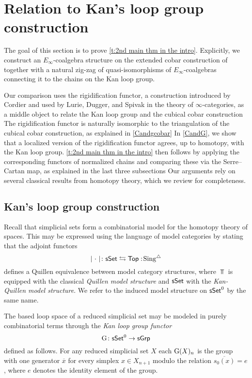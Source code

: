 
\section{Relation to Kan's loop group construction} \label{s:theorem2}

The goal of this section is to prove \cref{t:2nd main thm in the intro}.
Explicitly, we construct an $E_{\infty}$-coalgebra structure on the extended cobar construction of \cite{hess2010cobar} together with a natural zig-zag of quasi-isomorphisms of $E_{\infty}$-coalgebras connecting it to the chains on the Kan loop group.

Our comparison uses the rigidification functor, a construction introduced by Cordier and used by Lurie, Dugger, and Spivak in the theory of $\infty$-categories, as a middle object to relate the Kan loop group and the cubical cobar construction
The rigidification functor is naturally isomorphic to the triangulation of the cubical cobar construction, as explained in \cref{Candgcobar}
In \cref{CandG}, we show that a localized version of the rigidification functor agrees, up to homotopy, with the Kan loop group.
\cref{t:2nd main thm in the intro} then follows by applying the corresponding functors of normalized chains and comparing these via the Serre--Cartan map, as explained in the last three subsections
Our arguments rely on several classical results from homotopy theory, which we review for completeness.

\subsection{Kan's loop group construction}

Recall that simplicial sets form a combinatorial model for the homotopy theory of spaces.
This may be expressed using the language of model categories by stating that the adjoint functors
\[
\vert{\ \cdot\ }\vert \colon \mathsf{sSet} \leftrightarrows \mathsf{Top} :\! \operatorname{Sing^{\triangle}}
\]
defines a Quillen equivalence between model category structures, where $\Top$ is equipped with the classical \textit{Quillen model structure} and $\mathsf{sSet}$ with the \textit{Kan-Quillen model structure}.
We refer to the induced model structure on $\mathsf{sSet}^0$ by the same name.

The based loop space of a reduced simplicial set may be modeled in purely combinatorial terms through the \textit{Kan loop group functor}
\[
\operatorname{G} \colon \mathsf{sSet}^0 \to \mathsf{sGrp}
\]
defined as follows.
For any reduced simplicial set $X$ each $\operatorname{G}(X)_n$ is the group with one generator $\overline{x}$ for every simplex $x \in X_{n+1}$ modulo the relation $\overline{s_0(x)} = e$, where $e$ denotes the identity element of the group.


